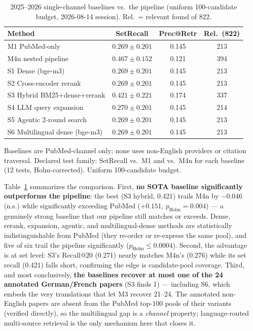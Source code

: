 \documentclass[sigconf,screen]{acmart}
\begin{document}
\begin{table}[t]
\centering
\small
\setlength{\tabcolsep}{4pt}
\begin{threeparttable}
\caption{2025--2026 single-channel baselines vs.\ the pipeline (uniform
100-candidate budget, 2026-08-14 session). Rel.\ = relevant found of 822.}
\label{tab:sota}
\begin{tabular}{@{}lccc@{}}
\toprule
Method & SetRecall & Prec@Retr & Rel.\ (822) \\
\midrule
M1 PubMed-only & $0.269\pm0.201$ & 0.145 & 213 \\
M4n nested pipeline & $0.467\pm0.152$ & 0.121 & 394 \\
S1 Dense (bge-m3) & $0.269\pm0.201$ & 0.145 & 213 \\
S2 Cross-encoder rerank & $0.269\pm0.201$ & 0.145 & 213 \\
S3 Hybrid BM25+dense+rerank & $0.421\pm0.221$ & 0.174 & 337 \\
S4 LLM query expansion & $0.270\pm0.201$ & 0.145 & 214 \\
S5 Agentic 2-round search & $0.269\pm0.201$ & 0.145 & 213 \\
S6 Multilingual dense (bge-m3) & $0.269\pm0.201$ & 0.145 & 213 \\
\bottomrule
\end{tabular}
\begin{tablenotes}
\item Baselines are PubMed-channel only; none uses non-English providers
or citation traversal. Declared test family: SetRecall vs.\ M1 and vs.\
M4n for each baseline (12 tests, Holm-corrected). Uniform 100-candidate
budget.
\end{tablenotes}
\end{threeparttable}
\end{table}

Table~\ref{tab:sota} summarizes the comparison. First,
\textbf{no SOTA baseline significantly outperforms the pipeline}: the
best (S3 hybrid, 0.421) trails M4n by $-0.046$ (n.s.) while
significantly exceeding PubMed ($+0.151$, $p_{\text{Holm}}{=}0.004$) ---
a genuinely strong baseline that our pipeline still matches or exceeds.
Dense, rerank, expansion, agentic, and multilingual-dense methods are
statistically indistinguishable from PubMed (they re-order or re-express
the same pool), and five of six trail the pipeline significantly
($p_{\text{Holm}} \le 0.0004$). Second, the advantage is at set level:
S3's Recall@20 (0.271) nearly matches M4n's (0.276) while its set recall
(0.421) falls short, confirming the edge is candidate-pool coverage.
Third, and most
conclusively, \textbf{the baselines recover at most one of the 24
annotated German/French papers} (S3 finds 1) --- including S6, which
embeds the very translations that let M3 recover 21--24. The annotated
non-English papers are absent from the PubMed top-100 pools of their
variants (verified directly), so the multilingual gap is a
\emph{channel} property; language-routed multi-source retrieval is the
only mechanism here that closes it.
\end{document}
